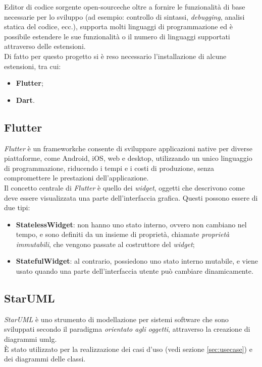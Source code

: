 Editor di codice sorgente \gls{open-source}\glsoccur che oltre a fornire le funzionalità di base necessarie per lo sviluppo (ad esempio: controllo di sintassi, \emph{debugging}, analisi statica del codice, ecc.), supporta molti linguaggi di programmazione ed è possibile estendere le sue funzionalità o il numero di linguaggi supportati attraverso delle estensioni.\\
Di fatto per questo progetto si è reso necessario l'installazione di alcune estensioni, tra cui:
\begin{itemize}
    \item \textbf{Flutter}\cite{site:flutter-extension};
    \item \textbf{Dart}\cite{site:dart-extension}.
\end{itemize}

\subsection*{Flutter}
\label{subsec:flutter}

\emph{Flutter}\cite{site:flutter} è un \gls{framework}\glsoccur che consente di sviluppare applicazioni native per diverse piattaforme, come Android, iOS, web e desktop, utilizzando un unico linguaggio di programmazione, riducendo i tempi e i costi di produzione, senza compromettere le prestazioni dell'applicazione.\\
Il concetto centrale di \emph{Flutter} è quello dei \emph{widget}, oggetti che descrivono come deve essere visualizzata una parte dell'interfaccia grafica. Questi possono essere di due tipi:
\begin{itemize}
    \item \textbf{StatelessWidget}: non hanno uno stato interno, ovvero non cambiano nel tempo, e sono definiti da un insieme di proprietà, chiamate \emph{proprietà immutabili}, che vengono passate al costruttore del \emph{widget};
    \item \textbf{StatefulWidget}: al contrario, possiedono uno stato interno mutabile, e viene usato quando una parte dell'interfaccia utente può cambiare dinamicamente.
\end{itemize}

\subsection*{StarUML}
\label{subsec:staruml}

\emph{StarUML}\cite{site:staruml} è uno strumento di modellazione per sistemi software che sono sviluppati secondo il paradigma \emph{orientato agli oggetti}, attraverso la creazione di diagrammi \gls{umlg}\glsoccur.\\
È stato utilizzato per la realizzazione dei casi d'uso (vedi sezione \ref{sec:usecase}) e dei diagrammi delle classi.

